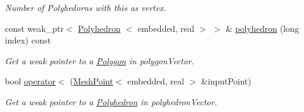 \begin{DoxyCompactItemize}
\begin{DoxyCompactList}\small\item\em \-Number of \-Polyhedorns with this as vertex. \end{DoxyCompactList}\item 
\hypertarget{class_mesh_point_a7bca0a9727c94dad3d9fef2aac8e310b}{const weak\-\_\-ptr$<$ \hyperlink{class_polyhedron}{\-Polyhedron}\*
$<$ embedded, real $>$ $>$ \& \hyperlink{class_mesh_point_a7bca0a9727c94dad3d9fef2aac8e310b}{polyhedron} (long index) const }\label{class_mesh_point_a7bca0a9727c94dad3d9fef2aac8e310b}

\begin{DoxyCompactList}\small\item\em \-Get a weak pointer to a \hyperlink{class_polygon}{\-Polygon} in polygon\-Vector. \end{DoxyCompactList}\item 
bool \hyperlink{class_mesh_point_a429995d48aa19e82d8beccf3068a8851}{operator$<$} (\hyperlink{class_mesh_point}{\-Mesh\-Point}$<$ embedded, real $>$ \&input\-Point)
\begin{DoxyCompactList}\small\item\em \-Get a weak pointer to a \hyperlink{class_polyhedron}{\-Polyhedron} in polyhedron\-Vector. \end{DoxyCompactList}\end{DoxyCompactItemize}
